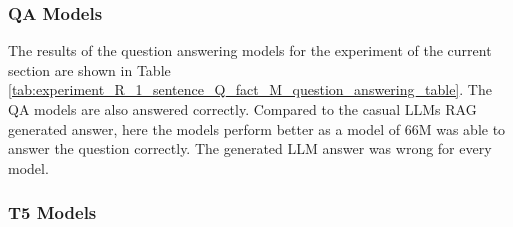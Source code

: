 \documentclass{wseas}
\begin{document}
\subsubsection{QA Models}

The results of the question answering models for the experiment of the 
current section are shown in Table \ref{tab:experiment_R_1_sentence_Q_fact_M_question_answering_table}.
The QA models are also answered correctly. Compared to the casual LLMs
RAG generated answer, here the models perform better as a model of 66M
was able to answer the question correctly. The generated LLM answer was
wrong for every model.

\subsubsection{T5 Models}

\end{document}
